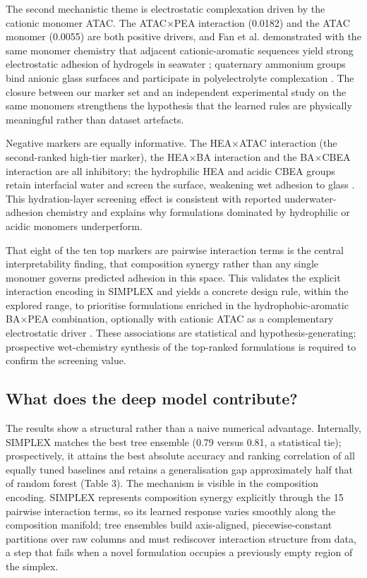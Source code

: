 \documentclass[utf8]{FrontiersinHarvard}
\begin{document}
The second mechanistic theme is electrostatic complexation driven by the cationic monomer ATAC. The ATAC$\times$PEA interaction (0.0182) and the ATAC monomer (0.0055) are both positive drivers, and Fan et al. demonstrated with the same monomer chemistry that adjacent cationic-aromatic sequences yield strong electrostatic adhesion of hydrogels in seawater \cite{fan2019cationicaromatic}; quaternary ammonium groups bind anionic glass surfaces and participate in polyelectrolyte complexation \cite{zhao2016polyelectrolyte,gong2010doublenetwork,wei2013musseldervied,wang2021selfcoacervation}. The closure between our marker set and an independent experimental study on the same monomers strengthens the hypothesis that the learned rules are physically meaningful rather than dataset artefacts.

Negative markers are equally informative. The HEA$\times$ATAC interaction (the second-ranked high-tier marker), the HEA$\times$BA interaction and the BA$\times$CBEA interaction are all inhibitory; the hydrophilic HEA and acidic CBEA groups retain interfacial water and screen the surface, weakening wet adhesion to glass \cite{zhang2022hydrationextent,valle2005hydrationforces,hommer2009polycarboxylate,narayanan2021underwater}. This hydration-layer screening effect is consistent with reported underwater-adhesion chemistry and explains why formulations dominated by hydrophilic or acidic monomers underperform.

That eight of the ten top markers are pairwise interaction terms is the central interpretability finding, that composition synergy rather than any single monomer governs predicted adhesion in this space. This validates the explicit interaction encoding in SIMPLEX and yields a concrete design rule, within the explored range, to prioritise formulations enriched in the hydrophobic-aromatic BA$\times$PEA combination, optionally with cationic ATAC as a complementary electrostatic driver \cite{cai2021bioadhesives,fan2019cationicaromatic}. These associations are statistical and hypothesis-generating; prospective wet-chemistry synthesis of the top-ranked formulations is required to confirm the screening value.

\subsection{What does the deep model contribute?}

The results show a structural rather than a naive numerical advantage. Internally, SIMPLEX matches the best tree ensemble (0.79 versus 0.81, a statistical tie); prospectively, it attains the best absolute accuracy and ranking correlation of all equally tuned baselines and retains a generalisation gap approximately half that of random forest (Table 3). The mechanism is visible in the composition encoding. SIMPLEX represents composition synergy explicitly through the 15 pairwise interaction terms, so its learned response varies smoothly along the composition manifold; tree ensembles build axis-aligned, piecewise-constant partitions over raw columns and must rediscover interaction structure from data, a step that fails when a novel formulation occupies a previously empty region of the simplex.
\end{document}
